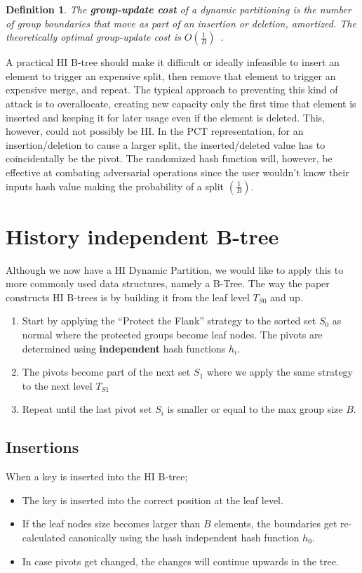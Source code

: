 \documentclass{article}
\newtheorem{definition}{Definition}
\begin{document}
\begin{definition}
    The \textbf{group-update cost} of a dynamic partitioning is the number of group boundaries that move as part of an insertion or deletion, amortized. The theoretically optimal group-update cost is $O(\frac{1}{B})$~\cite{HIDP}.
\end{definition}

A practical HI B-tree should make it difficult or ideally infeasible to insert an element to trigger an expensive split, then remove that element to trigger an expensive merge, and repeat. The typical approach to preventing this kind of attack is to overallocate, creating new capacity only the first time that element is inserted and keeping it for later usage even if the element is deleted. This, however, could not possibly be HI. In the PCT representation, for an insertion/deletion to cause a larger split, the inserted/deleted value has to coincidentally be the pivot. The randomized hash function will, however, be effective at combating adversarial operations since the user wouldn't know their inputs hash value making the probability of a split $(\frac{1}{B})$.

\section{History independent B-tree}

Although we now have a HI Dynamic Partition, we would like to apply this to more commonly used data structures, namely a B-Tree. The way the paper constructs HI B-trees is by building it from the leaf level $T_{S0}$ and up.
\begin{enumerate}
    \item Start by applying the ``Protect the Flank'' strategy to the sorted set $S_0$ as normal where the protected groups become leaf nodes. The pivots are determined using \textbf{independent} hash functions $h_i$.
    \item The pivots become part of the next set $S_1$ where we apply the same strategy to the next level $T_{S1}$
    \item Repeat until the last pivot set $S_i$ is smaller or equal to the max group size $B$.
\end{enumerate}

\subsection{Insertions}

When a key is inserted into the HI B-tree;
\begin{itemize}
    \item The key is inserted into the correct position at the leaf level.
    \item If the leaf nodes size becomes larger than $B$ elements, the boundaries get re-calculated canonically using the hash independent hash function $h_0$.
    \item In case pivots get changed, the changes will continue upwards in the tree.
\end{itemize}
\end{document}
